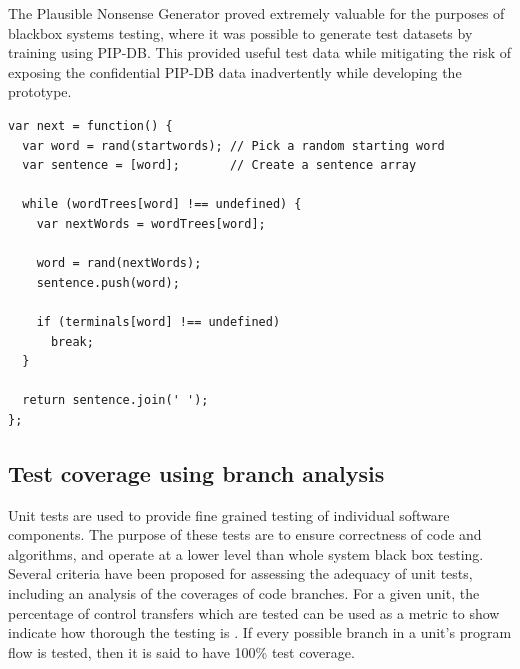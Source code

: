 The Plausible Nonsense Generator proved extremely valuable for the
purposes of blackbox systems testing, where it was possible to
generate test datasets by training using PIP-DB. This provided useful
test data while mitigating the risk of exposing the confidential
PIP-DB data inadvertently while developing the prototype.

\br{}


\lstset{language=JavaScript}
\begin{lstlisting}[label=lst:markov-text-generator,caption={%
      [Markov text generator]
      Markov text generator implementation.}]
var next = function() {
  var word = rand(startwords); // Pick a random starting word
  var sentence = [word];       // Create a sentence array

  while (wordTrees[word] !== undefined) {
    var nextWords = wordTrees[word];

    word = rand(nextWords);
    sentence.push(word);

    if (terminals[word] !== undefined)
      break;
  }

  return sentence.join(' ');
};
\end{lstlisting}

\newpage
\subsection{Test coverage using branch analysis}\label{subsec:branch-analysis}

Unit tests are used to provide fine grained testing of individual
software components. The purpose of these tests are to ensure
correctness of code and algorithms, and operate at a lower level than
whole system black box testing. Several criteria have been proposed
for assessing the adequacy of unit tests, including an analysis of the
coverages of code branches. For a given unit, the percentage of
control transfers which are tested can be used as a metric to show
indicate how thorough the testing is \cite{zhu1997software}. If every
possible branch in a unit's program flow is tested, then it is said to
have 100\% test coverage.

